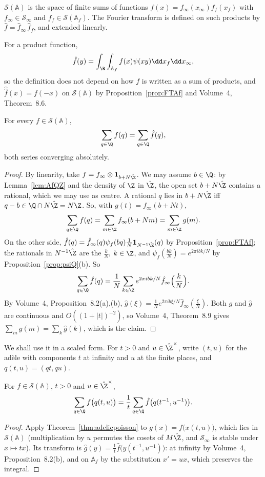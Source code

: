 \begin{definition}
$\mathcal S(\mathbb{A})$ is the space of finite sums of functions $f(x)=f_\infty(x_\infty)f_f(x_f)$ with $f_\infty\in\mathcal S_\infty$ and
$f_f\in\mathcal S(\mathbb{A}_f)$. The Fourier transform is defined on such products by $\hat f=\hat f_\infty\,\hat f_f$, and extended linearly.
\end{definition}

For a product function,
\[
\hat f(y)=\int_\R\int_{\mathbb{A}_f}f(x)\psi(xy)\dd x_f\dd x_\infty,
\]
so the definition does not depend on how $f$ is written as a
sum of products, and $\hat{\hat f}(x)=f(-x)$ on $\mathcal S(\mathbb{A})$ by Proposition~\ref{prop:FTAf} and Volume~4, Theorem~8.6.

\begin{theorem}\label{thm:adelicpoisson}
For every $f\in\mathcal S(\mathbb{A})$,
\[
\sum_{q\in\Q}f(q)=\sum_{q\in\Q}\hat f(q),
\]
both series converging absolutely.
\end{theorem}
\begin{proof}
By linearity, take $f=f_\infty\otimes\mathbf 1_{b+N\hat{\Z}}$. We may assume $b\in\Q$: by Lemma~\ref{lem:AfQZ} and the density of $\Z$ in
$\hat{\Z}$, the open set $b+N\hat{\Z}$ contains a rational, which we may use as centre. A rational $q$ lies in $b+N\hat{\Z}$ iff
$q-b\in\Q\cap N\hat{\Z}=N\Z$. So, with $g(t)=f_\infty(b+Nt)$,
\[
\sum_{q\in\Q}f(q)=\sum_{m\in\Z}f_\infty(b+Nm)=\sum_{m\in\Z}g(m).
\]
On the other side, $\hat f(q)=\hat f_\infty(q)\psi_f(bq)\frac1N\mathbf 1_{N^{-1}\hat{\Z}}(q)$ by Proposition~\ref{prop:FTAf}; the rationals in
$N^{-1}\hat{\Z}$ are the $\frac kN$, $k\in\Z$, and $\psi_f(\frac{bk}N)=e^{2\pi ibk/N}$ by Proposition~\ref{prop:psiQ}(b). So
\[
\sum_{q\in\Q}\hat f(q)=\frac1N\sum_{k\in\Z}e^{2\pi ibk/N}\hat f_\infty\Bigl(\frac kN\Bigr).
\]
By Volume~4, Proposition~8.2(a),(b), $\hat g(\xi)=\frac1Ne^{2\pi ib\xi/N}\hat f_\infty(\frac\xi N)$. Both $g$ and $\hat g$ are continuous
and $O((1+|t|)^{-2})$, so Volume~4, Theorem~8.9 gives $\sum_mg(m)=\sum_k\hat g(k)$, which is the claim.
\end{proof}

We shall use it in a scaled form. For $t>0$ and $u\in\hat{\Z}^\times$, write $(t,u)$ for the ad\`ele with components $t$ at infinity and
$u$ at the finite places, and $q(t,u)=(qt,qu)$.

\begin{corollary}\label{cor:scaledpoisson}
For $f\in\mathcal S(\mathbb{A})$, $t>0$ and $u\in\hat{\Z}^\times$,
\[
\sum_{q\in\Q}f\bigl(q(t,u)\bigr)=\frac1t\sum_{q\in\Q}\hat f\bigl(q(t^{-1},u^{-1})\bigr).
\]
\end{corollary}
\begin{proof}
Apply Theorem~\ref{thm:adelicpoisson} to $g(x)=f\bigl(x(t,u)\bigr)$, which lies in $\mathcal S(\mathbb{A})$ (multiplication by $u$ permutes the
cosets of $M\hat{\Z}$, and $\mathcal S_\infty$ is stable under $x\mapsto tx$). Its transform is $\hat g(y)=\frac1t\hat f\bigl(y(t^{-1},u^{-1})\bigr)$:
at infinity by Volume~4, Proposition~8.2(b), and on $\mathbb{A}_f$ by the substitution $x'=ux$, which preserves the integral.
\end{proof}

